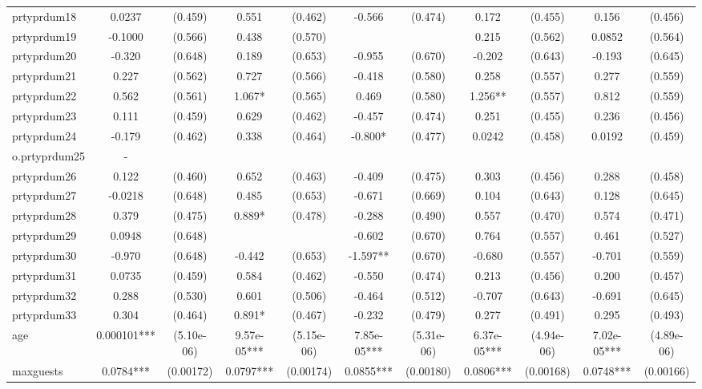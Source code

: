 \documentclass[]{article}
\begin{document}
\begin{tabular}{lcccccccccc}
prtyprdum18 & 0.0237 & (0.459) & 0.551 & (0.462) & -0.566 & (0.474) & 0.172 & (0.455) & 0.156 & (0.456) \\
prtyprdum19 & -0.1000 & (0.566) & 0.438 & (0.570) &  &  & 0.215 & (0.562) & 0.0852 & (0.564) \\
prtyprdum20 & -0.320 & (0.648) & 0.189 & (0.653) & -0.955 & (0.670) & -0.202 & (0.643) & -0.193 & (0.645) \\
prtyprdum21 & 0.227 & (0.562) & 0.727 & (0.566) & -0.418 & (0.580) & 0.258 & (0.557) & 0.277 & (0.559) \\
prtyprdum22 & 0.562 & (0.561) & 1.067* & (0.565) & 0.469 & (0.580) & 1.256** & (0.557) & 0.812 & (0.559) \\
prtyprdum23 & 0.111 & (0.459) & 0.629 & (0.462) & -0.457 & (0.474) & 0.251 & (0.455) & 0.236 & (0.456) \\
prtyprdum24 & -0.179 & (0.462) & 0.338 & (0.464) & -0.800* & (0.477) & 0.0242 & (0.458) & 0.0192 & (0.459) \\
o.prtyprdum25 & - &  &  &  &  &  &  &  &  &  \\
prtyprdum26 & 0.122 & (0.460) & 0.652 & (0.463) & -0.409 & (0.475) & 0.303 & (0.456) & 0.288 & (0.458) \\
prtyprdum27 & -0.0218 & (0.648) & 0.485 & (0.653) & -0.671 & (0.669) & 0.104 & (0.643) & 0.128 & (0.645) \\
prtyprdum28 & 0.379 & (0.475) & 0.889* & (0.478) & -0.288 & (0.490) & 0.557 & (0.470) & 0.574 & (0.471) \\
prtyprdum29 & 0.0948 & (0.648) &  &  & -0.602 & (0.670) & 0.764 & (0.557) & 0.461 & (0.527) \\
prtyprdum30 & -0.970 & (0.648) & -0.442 & (0.653) & -1.597** & (0.670) & -0.680 & (0.557) & -0.701 & (0.559) \\
prtyprdum31 & 0.0735 & (0.459) & 0.584 & (0.462) & -0.550 & (0.474) & 0.213 & (0.456) & 0.200 & (0.457) \\
prtyprdum32 & 0.288 & (0.530) & 0.601 & (0.506) & -0.464 & (0.512) & -0.707 & (0.643) & -0.691 & (0.645) \\
prtyprdum33 & 0.304 & (0.464) & 0.891* & (0.467) & -0.232 & (0.479) & 0.277 & (0.491) & 0.295 & (0.493) \\
age & 0.000101*** & (5.10e-06) & 9.57e-05*** & (5.15e-06) & 7.85e-05*** & (5.31e-06) & 6.37e-05*** & (4.94e-06) & 7.02e-05*** & (4.89e-06) \\
maxguests & 0.0784*** & (0.00172) & 0.0797*** & (0.00174) & 0.0855*** & (0.00180) & 0.0806*** & (0.00168) & 0.0748*** & (0.00166) \\

\end{tabular}
\end{document}
